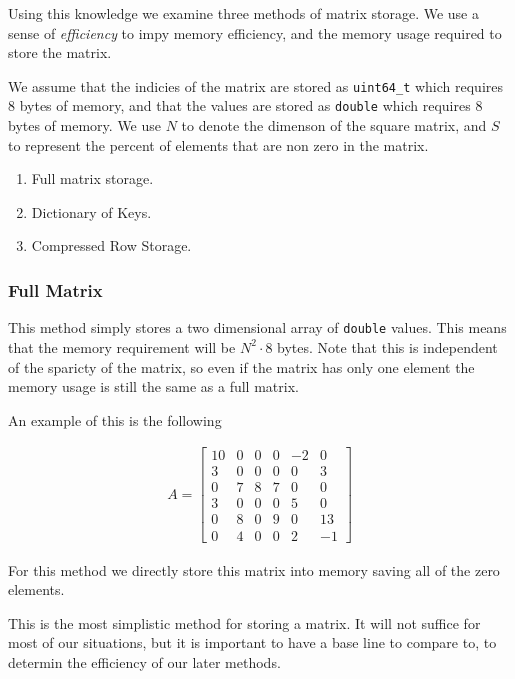 \documentclass[../fem.tex]{subfiles}
\begin{document}
Using this knowledge we examine three methods of matrix storage. We use a sense
of \textit{efficiency} to impy memory efficiency, and the memory usage required
to store the matrix.

We assume that the indicies of the matrix are stored as
\texttt{uint64_t} which requires $8$ bytes of memory, and that the
values are stored as \texttt{double} which requires $8$ bytes of
memory. We use $N$ to denote the dimenson of the square matrix, and $S$ to
represent the percent of elements that are non zero in the matrix.

\begin{enumerate}[label=\arabic*.]
  \item Full matrix storage.
  \item Dictionary of Keys.
  \item Compressed Row Storage.
\end{enumerate}

\subsubsection{Full Matrix}%
\label{ssub:full_matrix}

This method simply stores a two dimensional array of \texttt{double}
values. This means that the memory requirement will be $N^2\cdot 8$ bytes. Note
that this is independent of the sparicty of the matrix, so even if the matrix
has only one element the memory usage is still the same as a full matrix.

An example of this is the following

\begin{align*}
   A = \begin{bmatrix}
     10 & 0 & 0 & 0 & -2 & 0 \\
     3 & 0 & 0 & 0 & 0 & 3 \\
     0 & 7 & 8 & 7 & 0 & 0 \\
     3 & 0 & 0 & 0 & 5 & 0 \\
     0 & 8 & 0 & 9 & 0 & 13 \\
     0 & 4 & 0 & 0 & 2 & -1
   \end{bmatrix}
\end{align*}

For this method we directly store this matrix into memory saving all of the
zero elements.

This is the most simplistic method for storing a matrix. It will not suffice
for most of our situations, but it is important to have a base line to compare
to, to determin the efficiency of our later methods.
\end{document}
